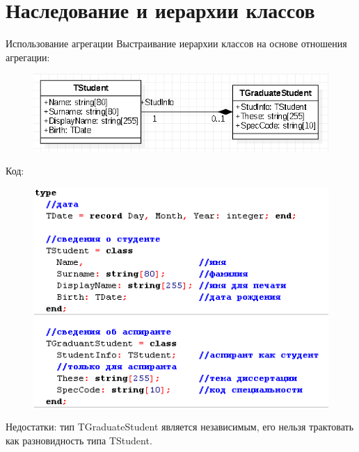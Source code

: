 \documentclass{beamer}
\begin{document}
\section{Наследование и иерархии классов}

\begin{frame}{Использование агрегации}
Выстраивание иерархии классов на основе отношения агрегации:
\begin{figure}[h]
\centering
\includegraphics[scale=0.4]{images/lec06-pic11.png}
\end{figure}
Код:
\begin{figure}[h]
\centering
\includegraphics[scale=0.4]{images/lec06-pic12.png}
\end{figure}
Недостатки: тип TGraduateStudent является независимым, его нельзя трактовать как разновидность типа TStudent.
\end{frame}
\end{document}
